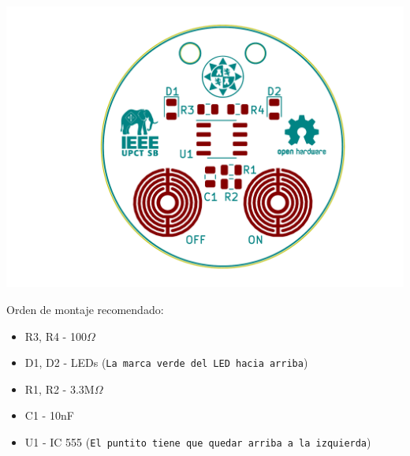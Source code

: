 \documentclass[12pt]{article}
\begin{document}
\begin{center}
    \includegraphics[width=\textwidth]{placa}

    \large Orden de montaje recomendado:
    \begin{itemize}
     \item R3, R4 - 100$\Omega$
     \item D1, D2 - LEDs {\color{Green} (\texttt{La marca verde del LED hacia arriba})}
     \item R1, R2 - 3.3M$\Omega$
     \item C1 - 10nF
     \item U1 - IC 555 {\color{Mahogany} (\texttt{El puntito tiene que quedar arriba a la izquierda})}
    \end{itemize}

    
    
\end{center}
\end{document}
